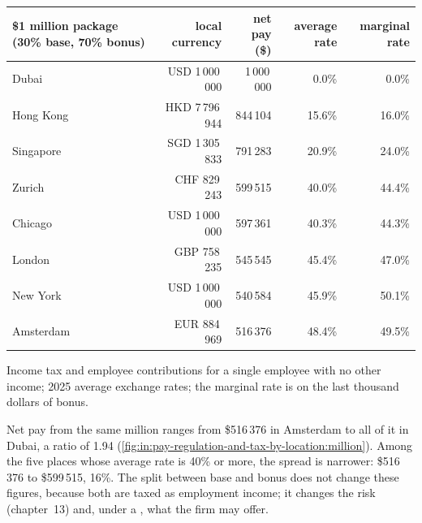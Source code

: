 \begin{center}\footnotesize
\begin{tabular}{@{}lrrrr@{}}
\toprule
\$1 million package (30\% base, 70\% bonus) & local currency & net pay (\$) & average rate & marginal rate\\
\midrule
Dubai & USD 1\,000\,000 & 1\,000\,000 & 0.0\% & 0.0\%\\
Hong Kong & HKD 7\,796\,944 & 844\,104 & 15.6\% & 16.0\%\\
Singapore & SGD 1\,305\,833 & 791\,283 & 20.9\% & 24.0\%\\
Zurich & CHF 829\,243 & 599\,515 & 40.0\% & 44.4\%\\
Chicago & USD 1\,000\,000 & 597\,361 & 40.3\% & 44.3\%\\
London & GBP 758\,235 & 545\,545 & 45.4\% & 47.0\%\\
New York & USD 1\,000\,000 & 540\,584 & 45.9\% & 50.1\%\\
Amsterdam & EUR 884\,969 & 516\,376 & 48.4\% & 49.5\%\\
\bottomrule
\end{tabular}

\smallskip Income tax and employee contributions for a single employee with no other income; 2025 average exchange
rates; the marginal rate is on the last thousand dollars of bonus.
\end{center}

Net pay from the same million ranges from \$516\,376 in Amsterdam to all of it in Dubai, a ratio of 1.94
(\cref{fig:in:pay-regulation-and-tax-by-location:million}). Among the five places whose average rate is 40\% or more,
the spread is narrower: \$516\,376 to \$599\,515, 16\%. The split between base and bonus does not change these figures, because both are
taxed as employment income; it changes the risk (chapter~13) and, under a , what the firm may offer.

